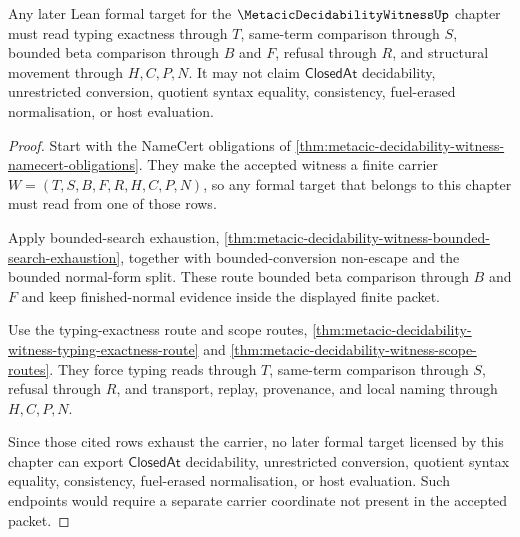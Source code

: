 \begin{theorem}
\label{thm:metacic-decidability-witness-formal-target-ledger}
Any later Lean formal target for the $\MetacicDecidabilityWitnessUp$ chapter must read typing exactness through $T$, same-term comparison through $S$, bounded beta comparison through $B$ and $F$, refusal through $R$, and structural movement through $H,C,P,N$. It may not claim $\mathsf{ClosedAt}$ decidability, unrestricted conversion, quotient syntax equality, consistency, fuel-erased normalisation, or host evaluation.
\end{theorem}
\begin{proof}
Start with the NameCert obligations of \autoref{thm:metacic-decidability-witness-namecert-obligations}. They make the accepted witness a finite carrier $W=(T,S,B,F,R,H,C,P,N)$, so any formal target that belongs to this chapter must read from one of those rows.

Apply bounded-search exhaustion, \autoref{thm:metacic-decidability-witness-bounded-search-exhaustion}, together with bounded-conversion non-escape and the bounded normal-form split. These route bounded beta comparison through $B$ and $F$ and keep finished-normal evidence inside the displayed finite packet.

Use the typing-exactness route and scope routes, \autoref{thm:metacic-decidability-witness-typing-exactness-route} and \autoref{thm:metacic-decidability-witness-scope-routes}. They force typing reads through $T$, same-term comparison through $S$, refusal through $R$, and transport, replay, provenance, and local naming through $H,C,P,N$.

Since those cited rows exhaust the carrier, no later formal target licensed by this chapter can export $\mathsf{ClosedAt}$ decidability, unrestricted conversion, quotient syntax equality, consistency, fuel-erased normalisation, or host evaluation. Such endpoints would require a separate carrier coordinate not present in the accepted packet.
\end{proof}

